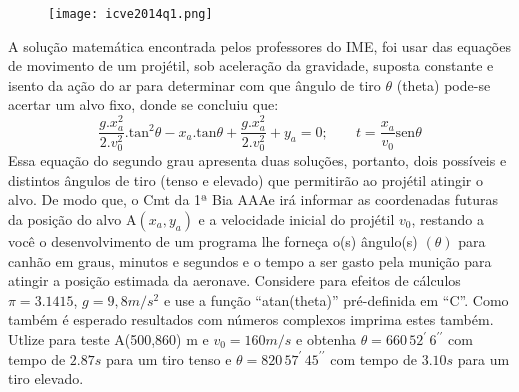 \documentclass[12pt,a4paper]{article}
\begin{document}
\begin{figure}[ht]
\centering
\texttt{[image: icve2014q1.png]}
\end{figure}

A solução matemática encontrada pelos professores do IME, foi usar das equações de movimento de um projétil, sob aceleração da gravidade, suposta constante e isento da ação do ar para determinar com que ângulo de tiro $\theta$ (theta) pode-se acertar um alvo fixo, donde se concluiu que:
$$\dfrac{g.x_a^2}{2.v_0^2}.\mathrm{tan}^2\theta-x_a.\mathrm{tan}\theta+\dfrac{g.x_a^2}{2.v_0^2}+y_a=0; \;\;\;\;\;\;\;t=\dfrac{x_a}{v_0}\mathrm{sen}\theta$$
Essa equação do segundo grau apresenta duas soluções, portanto, dois possíveis e distintos ângulos de tiro (tenso e elevado) que permitirão ao projétil atingir o alvo. De modo que, o Cmt da 1ª Bia AAAe irá informar as coordenadas futuras da posição do alvo A$(x_a,y_a)$ e a velocidade inicial do projétil $v_0$, restando a você o desenvolvimento de um programa lhe forneça o(s) ângulo(s) $(\theta)$ para canhão em graus, minutos e segundos e o tempo a ser gasto pela munição para atingir a posição estimada da aeronave. Considere para efeitos de cálculos $\pi=3.1415$, $g=9,8m/s^2$ e use a função “atan(theta)” pré-definida em “C”. Como também é esperado resultados com números complexos imprima estes também.\\
Utlize para teste  A(500,860) m e $v_0= 160m/s$ e obtenha $\theta=660\, 52^{\prime}\, 6^{\prime\prime}$ com tempo de $2.87s$ para um tiro tenso e  $\theta=820 \,57^{\prime}\, 45^{\prime\prime}$ com tempo de $3.10s$ para um tiro elevado.
\end{document}
